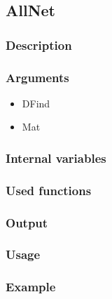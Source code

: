 \subsection{AllNet}
\subsubsection{Description}
\subsubsection{Arguments}

\begin{itemize}
\item DFind
\item Mat
\end{itemize}
\subsubsection{Internal variables}
\subsubsection{Used functions}
\subsubsection{Output}
\subsubsection{Usage}
\subsubsection{Example}



